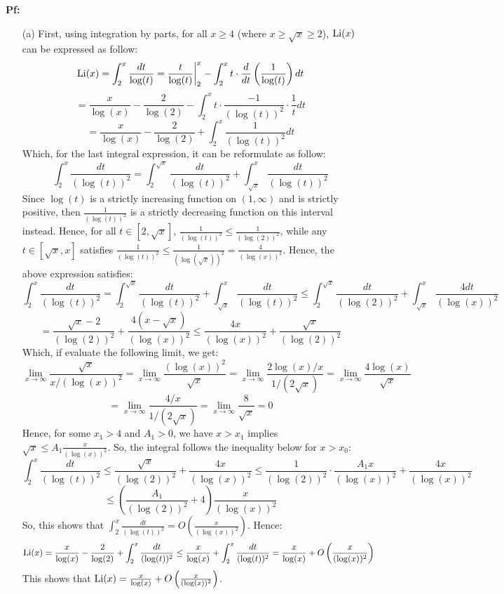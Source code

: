 \documentclass{article}
\begin{document}
\textbf{Pf:}
\begin{itemize}
    \item[(a)] First, using integration by parts, for all $x\geq 4$ (where $x\geq \sqrt{x}\geq 2$), $\textmd{Li}(x)$ can be expressed as follow:
    $$\textmd{Li}(x)=\int_{2}^{x}\frac{dt}{\log(t)} = \frac{t}{\log(t)}\bigg|_{2}^{x}-\int_{2}^{x}t\cdot \frac{d}{dt}\left(\frac{1}{\log(t)}\right)dt$$
    $$ = \frac{x}{\log(x)}-\frac{2}{\log(2)}-\int_{2}^{x}t\cdot\frac{-1}{(\log(t))^2}\cdot\frac{1}{t}dt$$
    $$ = \frac{x}{\log(x)}-\frac{2}{\log(2)}+\int_{2}^{x}\frac{1}{(\log(t))^2}dt$$
    Which, for the last integral expression, it can be reformulate as follow:
    $$\int_{2}^{x}\frac{dt}{(\log(t))^2} = \int_{2}^{\sqrt{x}}\frac{dt}{(\log(t))^2}+\int_{\sqrt{x}}^{x}\frac{dt}{(\log(t))^2}$$
    Since $\log(t)$ is a strictly increasing function on $(1,\infty)$ and is strictly positive, then $\frac{1}{(\log(t))^2}$ is a strictly decreasing function on this interval instead. Hence, for all $t\in [2,\sqrt{x}]$, $\frac{1}{(\log(t))^2}\leq \frac{1}{(\log(2))^2}$, while any $t\in [\sqrt{x},x]$ satisfies $\frac{1}{(\log(t))^2}\leq \frac{1}{(\log(\sqrt{x}))^2} = \frac{4}{(\log(x))^2}$. Hence, the above expression satisfies:
    $$\int_{2}^{x}\frac{dt}{(\log(t))^2} = \int_{2}^{\sqrt{x}}\frac{dt}{(\log(t))^2}+\int_{\sqrt{x}}^{x}\frac{dt}{(\log(t))^2}\leq \int_{2}^{\sqrt{x}}\frac{dt}{(\log(2))^2}+\int_{\sqrt{x}}^{x}\frac{4dt}{(\log(x))^2}$$
    $$ = \frac{\sqrt{x}-2}{(\log(2))^2} + \frac{4(x-\sqrt{x})}{(\log(x))^2}\leq \frac{4x}{(\log(x))^2}+\frac{\sqrt{x}}{(\log(2))^2}$$
    Which, if evaluate the following limit, we get:
    $$\lim_{x\rightarrow\infty}\frac{\sqrt{x}}{x/(\log(x))^2} = \lim_{x\rightarrow\infty}\frac{(\log(x))^2}{\sqrt{x}} = \lim_{x\rightarrow\infty}\frac{2\log(x)/x}{1/(2\sqrt{x})} = \lim_{x\rightarrow\infty}\frac{4\log(x)}{\sqrt{x}}$$
    $$= \lim_{x\rightarrow\infty}\frac{4/x}{1/(2\sqrt{x})} = \lim_{x\rightarrow\infty}\frac{8}{\sqrt{x}}=0$$
    Hence, for some $x_1>4$ and $A_1>0$, we have $x>x_1$ implies $\sqrt{x}\leq A_1\frac{x}{(\log(x))^2}$. So, the integral follows the inequality below for $x>x_0$:
    $$\int_{2}^{x}\frac{dt}{(\log(t))^2}\leq \frac{\sqrt{x}}{(\log(2))^2} + \frac{4x}{(\log(x))^2} \leq \frac{1}{(\log(2))^2}\cdot\frac{A_1x}{(\log(x))^2}+\frac{4x}{(\log(x))^2}$$
    $$\leq \left(\frac{A_1}{(\log(2))^2}+4\right)\frac{x}{(\log(x))^2}$$
    So, this shows that $\int_{2}^{x}\frac{dt}{(\log(t))^2}=O\left(\frac{x}{(\log(x))^2}\right)$. Hence:
    $$\textmd{Li}(x)=\frac{x}{\log(x)}-\frac{2}{\log(2)}+\int_{2}^{x}\frac{dt}{(\log(t))^2}\leq \frac{x}{\log(x)}+\int_{2}^{x}\frac{dt}{(\log(t))^2} = \frac{x}{\log(x)}+O\left(\frac{x}{(\log(x))^2}\right)$$
    This shows that $\textmd{Li}(x)=\frac{x}{\log(x)}+O\left(\frac{x}{(\log(x))^2}\right)$.


\end{itemize}
\end{document}
